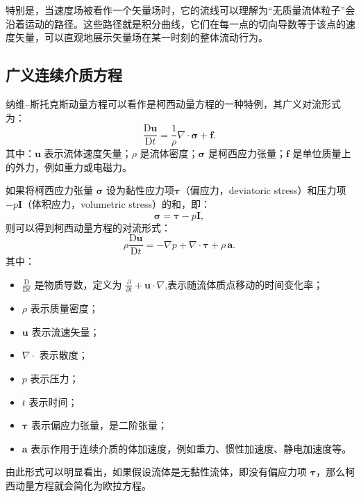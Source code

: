 特别是，当速度场被看作一个矢量场时，它的流线可以理解为“无质量流体粒子”会沿着运动的路径。这些路径就是积分曲线，它们在每一点的切向导数等于该点的速度矢量，可以直观地展示矢量场在某一时刻的整体流动行为。
\subsection{广义连续介质方程}
纳维–斯托克斯动量方程可以看作是柯西动量方程的一种特例，其广义对流形式为：
$$
\frac{\mathrm{D} \mathbf{u}}{\mathrm{D} t} = \frac{1}{\rho} \nabla \cdot \boldsymbol{\sigma} + \mathbf{f}.~
$$
其中：$\mathbf{u}$ 表示流体速度矢量；$\rho$ 是流体密度；$\boldsymbol{\sigma}$ 是柯西应力张量；$\mathbf{f}$ 是单位质量上的外力，例如重力或电磁力。

如果将柯西应力张量 $\boldsymbol{\sigma}$ 设为黏性应力项$\boldsymbol{\tau}$（偏应力，deviatoric stress）和压力项$-p\mathbf{I}$（体积应力，volumetric stress）的和，即：
$$
\boldsymbol{\sigma} = \boldsymbol{\tau} - p\mathbf{I},~
$$
则可以得到柯西动量方程的对流形式：
$$
\rho \frac{\mathrm{D} \mathbf{u}}{\mathrm{D} t} = -\nabla p + \nabla \cdot \boldsymbol{\tau} + \rho \,\mathbf{a}.~
$$
其中：
\begin{itemize}
\item $\displaystyle \frac{\mathrm{D}}{\mathrm{D}t}$ 是物质导数，定义为
$\frac{\partial}{\partial t} + \mathbf{u} \cdot \nabla$,表示随流体质点移动的时间变化率；
\item $\rho$ 表示质量密度；
\item $\mathbf{u}$ 表示流速矢量；
\item $\nabla \cdot$ 表示散度；
\item $p$ 表示压力；
\item $t$ 表示时间；
\item $\boldsymbol{\tau}$ 表示偏应力张量，是二阶张量；
\item $\mathbf{a}$ 表示作用于连续介质的体加速度，例如重力、惯性加速度、静电加速度等。
\end{itemize}
由此形式可以明显看出，如果假设流体是无黏性流体，即没有偏应力项 $\boldsymbol{\tau}$，那么柯西动量方程就会简化为欧拉方程。

